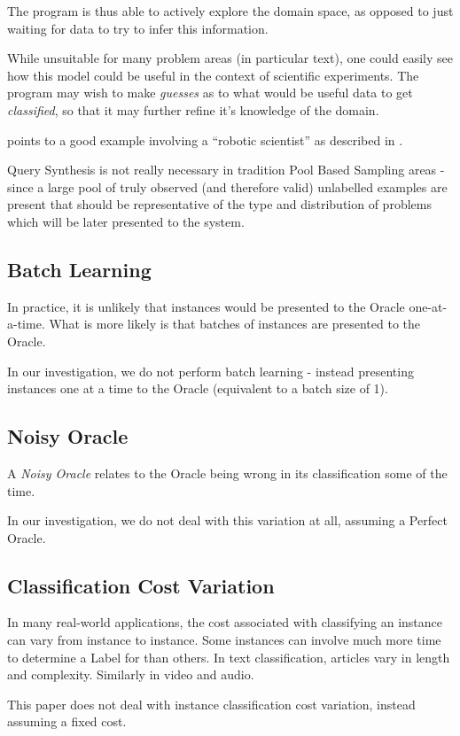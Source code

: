 \documentclass[a4paper,11pt]{report}
\begin{document}
The program is thus able to actively explore the domain space, as opposed to just waiting for data to try to infer this information.

While unsuitable for many problem areas (in particular text), one could easily see how this model could be useful in the context of scientific experiments. The program may wish to make \emph{guesses} as to what would be useful data to get \emph{classified}, so that it may further refine it's knowledge of the domain.

\citep{Settles2010} points to a good example involving a ``robotic scientist'' as described in \citep{King2009}.

Query Synthesis is not really necessary in tradition Pool Based Sampling areas - since a large pool of truly observed (and therefore valid) unlabelled examples are present that should be representative of the type and distribution of problems which will be later presented to the system.

\subsection{Batch Learning}
In practice, it is unlikely that instances would be presented to the Oracle one-at-a-time. What is more likely is that batches of instances are presented to the Oracle.

In our investigation, we do not perform batch learning - instead presenting instances one at a time to the Oracle (equivalent to a batch size of 1).

\subsection{Noisy Oracle}
A \emph{Noisy Oracle} relates to the Oracle being wrong in its classification some of the time.

In our investigation, we do not deal with this variation at all, assuming a Perfect Oracle.

\subsection{Classification Cost Variation}
In many real-world applications, the cost associated with classifying an instance can vary from instance to instance. Some instances can involve much more time to determine a Label for than others. In text classification, articles vary in length and complexity. Similarly in video and audio.

This paper does not deal with instance classification cost variation, instead assuming a fixed cost.
\end{document}
